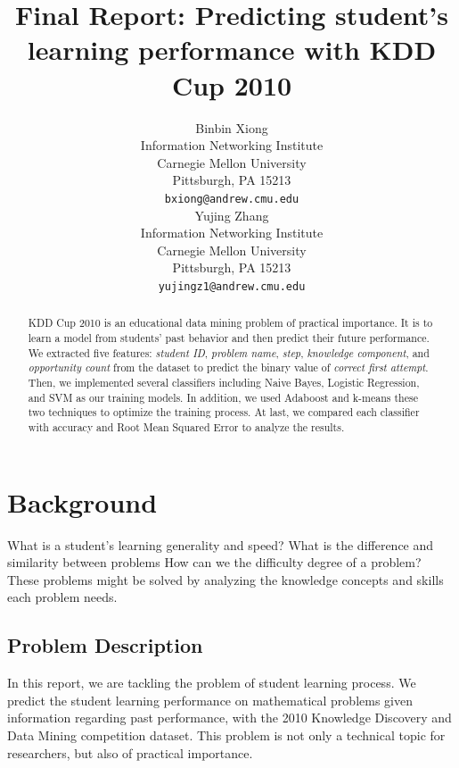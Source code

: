 \documentclass{article} %
\title{Final Report: Predicting student's learning performance with KDD Cup 2010}
\author{
Binbin Xiong\\
Information Networking Institute\\
Carnegie Mellon University\\
Pittsburgh, PA 15213 \\
\texttt{bxiong@andrew.cmu.edu} \\
\And
Yujing Zhang\\
Information Networking Institute\\
Carnegie Mellon University\\
Pittsburgh, PA 15213 \\
\texttt{yujingz1@andrew.cmu.edu}
}
\begin{document}
\maketitle

\begin{abstract}
KDD Cup 2010 is an educational data mining problem of practical importance. It is to learn a model from students' past behavior and then predict their future performance. We extracted five features: \emph{student ID}, \emph{problem name}, \emph{step}, \emph{knowledge component}, and \emph{opportunity count} from the dataset to predict the binary value of \emph{correct first attempt}. Then, we implemented several classifiers including Naive Bayes, Logistic Regression, and SVM as our training models. In addition, we used Adaboost and k-means these two techniques to optimize the training process. At last, we compared each classifier with accuracy and Root Mean Squared Error to analyze the results.

\end{abstract}

\section{Background}
What is a student's learning generality and speed? What is the difference and similarity between problems How can we the difficulty degree of a problem? These problems might be solved by analyzing the knowledge concepts and skills each problem needs.


\subsection{Problem Description}

In this report, we are tackling the problem of student learning process. We predict the student learning performance on mathematical problems given information regarding past performance, with the 2010 Knowledge Discovery and Data Mining competition dataset. This problem is not only a technical topic for researchers, but also of practical importance.


\end{document}

